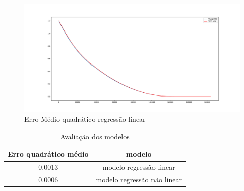 \begin{figure}[H]
    \label{fig:error:quadratico:linear}
    \centering
    \includegraphics[scale=0.3]{figuras/mse_error_linear.pdf}
    \caption{Erro Médio quadrático regressão linear}
\end{figure}


\begin{table}[H]
    \centering
    \begin{tabular}{c|c}
        \hline
        Erro quadrático médio & modelo \\
        \hline
        0.0013 & modelo regressão linear \\
        \hline
        0.0006 & modelo regressão não linear \\
        \hline
    \end{tabular}
    \caption{Avaliação dos modelos}
\end{table}